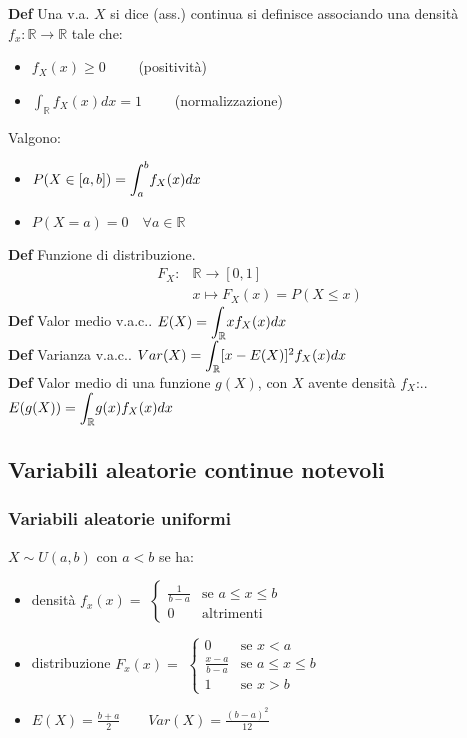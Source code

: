 \documentclass[10pt,a4paper]{article}
\begin{document}
\begin{multicols}{2}
\textbf{Def}
    Una v.a. $X$ si dice (ass.) continua si definisce associando una densit\`a $f_x : \mathbb{R}\to\mathbb{R}$ tale che:
\begin{itemize}
    \item $f_X(x) \geq 0 \qquad$ (positività)
    \item $\int_\mathbb{R} f_X(x) dx = 1 \qquad$ (normalizzazione)
\end{itemize}
Valgono:
\begin{itemize}
    \item $P(X \in [a,b]) = \mathlarger{\int_{a}^{b}} f_X(x)dx$
    \item $P(X = a) = 0\quad\forall a\in\mathbb{R}$
\end{itemize}
\textbf{Def} Funzione di distribuzione. \\
\begin{align*}
    F_X:    &\mathbb{R} \to [0, 1] \\
            &x \mapsto F_X(x) = P(X \leq x)
\end{align*}
\textbf{Def} Valor medio v.a.c.. \textit{
    $E(X) = \mathlarger{\int_\mathbb{R}} x f_X(x)dx$
}\\
\textbf{Def} Varianza v.a.c.. \textit{
    $Var(X) = \mathlarger{\int_\mathbb{R}} [x - E(X)]^2 f_X(x)dx$
}\\
\textbf{Def} Valor medio di una funzione $g(X)$, con $X$ avente densità $f_X$:.. \textit{
    $E(g(X)) = \mathlarger{\int_\mathbb{R}} g(x) f_X(x)dx$
}\\








\subsection*{Variabili aleatorie continue notevoli}
\subsubsection*{Variabili aleatorie uniformi}
$X\sim U(a,b)$ con $a<b$ se ha:
\begin{itemize}
    \item densità $f_x(x) =$
        $ \begin{cases}
            \frac{1}{b-a} &\mbox{se } a\leq x\leq b \\
            0 &\mbox{altrimenti}
        \end{cases} $
    \item distribuzione $F_x(x) =$
        $ \begin{cases}
            0 &\mbox{se } x<a\\
            \frac{x-a}{b-a} &\mbox{se } a\leq x\leq b \\
            1 &\mbox{se } x>b
        \end{cases} $
    \item $E(X)=\frac{b+a}{2} \qquad Var(X)=\frac{(b-a)^2}{12}$
\end{itemize}
    

\end{multicols}
\end{document}
